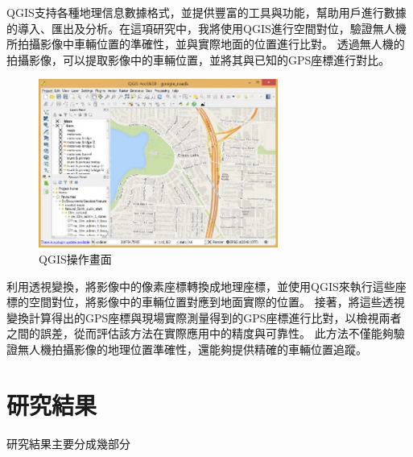 \documentclass[12pt]{article}       %
\begin{document}
QGIS支持各種地理信息數據格式，並提供豐富的工具與功能，幫助用戶進行數據的導入、匯出及分析。在這項研究中，我將使用QGIS進行空間對位，驗證無人機所拍攝影像中車輛位置的準確性，並與實際地面的位置進行比對。
透過無人機的拍攝影像，可以提取影像中的車輛位置，並將其與已知的GPS座標進行對比。
\begin{figure}[H]
    \centering
    \includegraphics[width=0.7\textwidth]{qgis.jpg}     %
    \caption{QGIS操作畫面\cite{qgis_2020}}    %
    \label{fig:qgis}    %
\end{figure}
利用透視變換，將影像中的像素座標轉換成地理座標，並使用QGIS來執行這些座標的空間對位，將影像中的車輛位置對應到地面實際的位置。
接著，將這些透視變換計算得出的GPS座標與現場實際測量得到的GPS座標進行比對，以檢視兩者之間的誤差，從而評估該方法在實際應用中的精度與可靠性。
此方法不僅能夠驗證無人機拍攝影像的地理位置準確性，還能夠提供精確的車輛位置追蹤。


\section{\centering 研究結果}
\hspace{2em}研究結果主要分成幾部分

\end{document}
